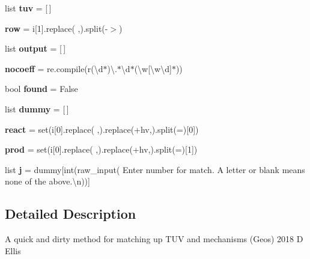 \begin{DoxyCompactItemize}
\item 
\mbox{\label{namespaceg2t_ae0fb59daa9c81fc9c2d2b0040ef88cbb}} 
list {\bfseries tuv} = \mbox{[}$\,$\mbox{]}
\item 
\mbox{\label{namespaceg2t_a884129b158424054ef8a7f0682e2a67b}} 
{\bfseries row} = i\mbox{[}1\mbox{]}.replace(\textquotesingle{} \textquotesingle{},\textquotesingle{}\textquotesingle{}).split(\textquotesingle{}-\/$>$\textquotesingle{})
\item 
\mbox{\label{namespaceg2t_a4866be7394a9832dbce784554b660d94}} 
list {\bfseries output} = \mbox{[}$\,$\mbox{]}
\item 
\mbox{\label{namespaceg2t_a8383f14b85c70179c9dfb9a686da2aef}} 
{\bfseries nocoeff} = re.\+compile(r\textquotesingle{}(\textbackslash{}d$\ast$)\textbackslash{}.$\ast$\textbackslash{}d$\ast$(\textbackslash{}w\mbox{[}\textbackslash{}w\textbackslash{}d\mbox{]}$\ast$)\textquotesingle{})
\item 
\mbox{\label{namespaceg2t_a7105d9709382aff0739fbf8569af3fa4}} 
bool {\bfseries found} = False
\item 
\mbox{\label{namespaceg2t_a74bd06d5318dd5910122f6bf995e134d}} 
list {\bfseries dummy} = \mbox{[}$\,$\mbox{]}
\item 
\mbox{\label{namespaceg2t_aed5e882ca8f94a366e8542cf4e7c6031}} 
{\bfseries react} = set(i\mbox{[}0\mbox{]}.replace(\textquotesingle{} \textquotesingle{},\textquotesingle{}\textquotesingle{}).replace(\textquotesingle{}+hv\textquotesingle{},\textquotesingle{}\textquotesingle{}).split(\textquotesingle{}=\textquotesingle{})\mbox{[}0\mbox{]})
\item 
\mbox{\label{namespaceg2t_ad01d2efd5ec20efaf83afbdd8a4186de}} 
{\bfseries prod} = set(i\mbox{[}0\mbox{]}.replace(\textquotesingle{} \textquotesingle{},\textquotesingle{}\textquotesingle{}).replace(\textquotesingle{}+hv\textquotesingle{},\textquotesingle{}\textquotesingle{}).split(\textquotesingle{}=\textquotesingle{})\mbox{[}1\mbox{]})
\item 
\mbox{\label{namespaceg2t_acbe5b22306b2cb54d1cac48c14b9d3d5}} 
list {\bfseries j} = dummy\mbox{[}int(raw\+\_\+input(\textquotesingle{} Enter number for match. A letter or blank means none of the above.\textbackslash{}n\textquotesingle{}))\mbox{]}
\end{DoxyCompactItemize}


\subsection{Detailed Description}
\begin{DoxyVerb}A quick and dirty method for matching up TUV and mechanisms (Geos) 
2018 D Ellis
\end{DoxyVerb}
 